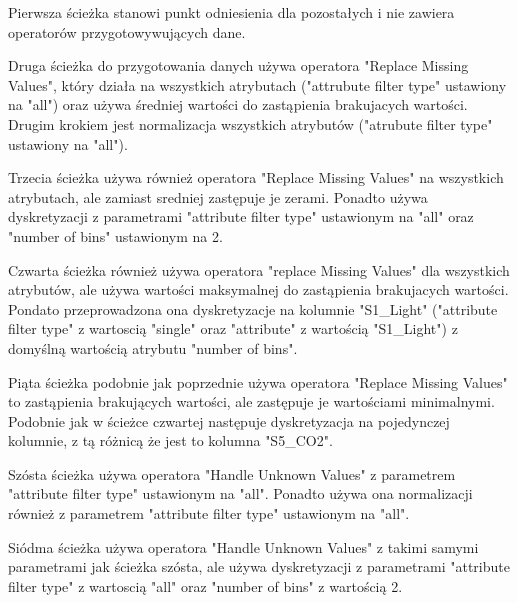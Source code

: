 \documentclass[12pt,oneside,a4paper]{book} %
\theoremstyle{break}
\begin{document}
Pierwsza ścieżka stanowi punkt odniesienia dla pozostałych i nie zawiera operatorów przygotowywujących dane.

Druga ścieżka do przygotowania danych używa operatora "Replace Missing Values", który działa na wszystkich atrybutach ("attrubute filter type" ustawiony na "all") oraz używa średniej wartości do zastąpienia brakujacych wartości. Drugim krokiem jest normalizacja wszystkich atrybutów ("atrubute filter type" ustawiony na "all").

Trzecia ścieżka używa również operatora "Replace Missing Values" na wszystkich atrybutach, ale zamiast sredniej zastępuje je zerami. Ponadto używa dyskretyzacji z parametrami "attribute filter type" ustawionym na "all" oraz "number of bins" ustawionym na 2.

Czwarta ścieżka również używa operatora "replace Missing Values" dla wszystkich atrybutów, ale używa wartości maksymalnej do zastąpienia brakujacych wartości.
Pondato przeprowadzona ona dyskretyzacje na kolumnie "S1\_Light" ("attribute filter type" z wartoscią "single" oraz "attribute" z wartością "S1\_Light") z domyślną wartością atrybutu "number of bins".

Piąta ścieżka podobnie jak poprzednie używa operatora "Replace Missing Values" to zastąpienia brakujących wartości, ale zastępuje je wartościami minimalnymi. Podobnie jak w ścieżce czwartej następuje dyskretyzacja na pojedynczej kolumnie, z tą różnicą że jest to kolumna "S5\_CO2".

Szósta ścieżka używa operatora "Handle Unknown Values" z parametrem "attribute filter type" ustawionym na "all". Ponadto używa ona normalizacji również z parametrem "attribute filter type" ustawionym na "all".

Siódma ścieżka używa operatora "Handle Unknown Values" z takimi samymi parametrami jak ścieżka szósta, ale używa dyskretyzacji z parametrami "attribute filter type" z wartoscią "all" oraz "number of bins" z wartością 2.
\end{document}
